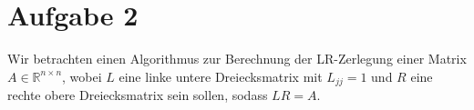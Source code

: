 \documentclass[english, parskip=full]{scrartcl}
\newcommand{\tecxt}{}
\begin{document}
\section*{Aufgabe 2}
Wir betrachten einen Algorithmus zur Berechnung der LR-Zerlegung einer Matrix $A\in\mathbb{R}^{n\times n}$, wobei $L$ eine linke untere Dreiecksmatrix mit $L_{jj} = 1$ und $R$ eine rechte obere Dreiecksmatrix sein sollen, sodass $LR=A$.
\end{document}
